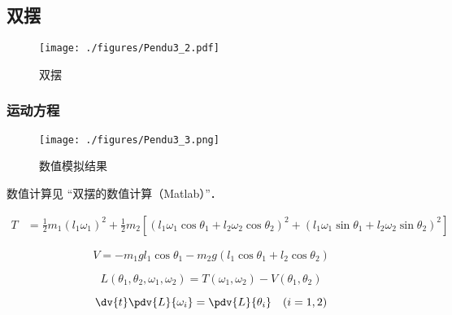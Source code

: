 
\begin{issues}
\issueDraft
\end{issues}


\subsection{双摆}
\begin{figure}[ht]
\centering
\texttt{[image: ./figures/Pendu3\_2.pdf]}
\caption{双摆} \label{Pendu3_fig2}
\end{figure}

\subsubsection{运动方程}
\begin{figure}[ht]
\centering
\texttt{[image: ./figures/Pendu3\_3.png]}
\caption{数值模拟结果} \label{Pendu3_fig3}
\end{figure}
数值计算见 “双摆的数值计算（Matlab）”．

\begin{equation}
\begin{aligned}
T &= \frac{1}{2} m_1 (l_1 \omega_1)^2 + \frac{1}{2} m_2 [(l_1 \omega_1 \cos\theta_1 + l_2 \omega_2 \cos\theta_2)^2 + (l_1 \omega_1 \sin\theta_1 + l_2 \omega_2 \sin\theta_2)^2]
\end{aligned}
\end{equation}

\begin{equation}  
V = -m_1 g l_1 \cos \theta_1 - m_2 g (l_1\cos \theta_1 + l_2 \cos \theta_2)
\end{equation}

\begin{equation}
L(\theta_1, \theta_2, \omega_1, \omega_2) = T(\omega_1, \omega_2) - V(\theta_1, \theta_2)
\end{equation}

\begin{equation}\label{Pendu3_eq1}
\dv{t}\pdv{L}{\omega_i} = \pdv{L}{\theta_i} \quad (i=1,2)
\end{equation}


